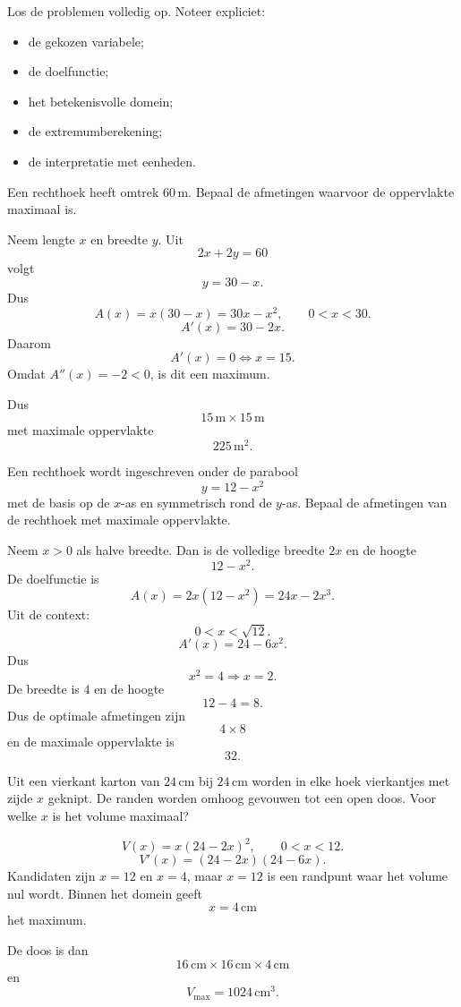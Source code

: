 \documentclass{ximera}
\begin{document}
\begin{oefening}{\oefU\ESS}
Los de problemen volledig op. Noteer expliciet:

\begin{itemize}
  \item de gekozen variabele;
  \item de doelfunctie;
  \item het betekenisvolle domein;
  \item de extremumberekening;
  \item de interpretatie met eenheden.
\end{itemize}

\begin{question}
Een rechthoek heeft omtrek \(60\,\mathrm m\). Bepaal de afmetingen
waarvoor de oppervlakte maximaal is.

\begin{oplossing}
Neem lengte \(x\) en breedte \(y\). Uit
\[
2x+2y=60
\]
volgt
\[
y=30-x.
\]
Dus
\[
A(x)=x(30-x)=30x-x^2,
\qquad 0<x<30.
\]
\[
A'(x)=30-2x.
\]
Daarom
\[
A'(x)=0\Longleftrightarrow x=15.
\]
Omdat \(A''(x)=-2<0\), is dit een maximum.

Dus
\[
\boxed{15\,\mathrm m\times15\,\mathrm m}
\]
met maximale oppervlakte
\[
\boxed{225\,\mathrm m^2}.
\]
\end{oplossing}
\end{question}

\begin{question}
Een rechthoek wordt ingeschreven onder de parabool
\[
y=12-x^2
\]
met de basis op de \(x\)-as en symmetrisch rond de \(y\)-as. Bepaal de
afmetingen van de rechthoek met maximale oppervlakte.

\begin{oplossing}
Neem \(x>0\) als halve breedte. Dan is de volledige breedte \(2x\) en
de hoogte
\[
12-x^2.
\]
De doelfunctie is
\[
A(x)=2x(12-x^2)=24x-2x^3.
\]
Uit de context:
\[
0<x<\sqrt{12}.
\]
\[
A'(x)=24-6x^2.
\]
Dus
\[
x^2=4\Longrightarrow x=2.
\]
De breedte is \(4\) en de hoogte
\[
12-4=8.
\]
Dus de optimale afmetingen zijn
\[
\boxed{4\times8}
\]
en de maximale oppervlakte is
\[
\boxed{32}.
\]
\end{oplossing}
\end{question}

\begin{question}
Uit een vierkant karton van \(24\,\mathrm{cm}\) bij
\(24\,\mathrm{cm}\) worden in elke hoek vierkantjes met zijde \(x\)
geknipt. De randen worden omhoog gevouwen tot een open doos. Voor welke
\(x\) is het volume maximaal?

\begin{oplossing}
\[
V(x)=x(24-2x)^2,
\qquad 0<x<12.
\]
\[
V'(x)=(24-2x)(24-6x).
\]
Kandidaten zijn \(x=12\) en \(x=4\), maar \(x=12\) is een randpunt waar
het volume nul wordt. Binnen het domein geeft
\[
\boxed{x=4\,\mathrm{cm}}
\]
het maximum.

De doos is dan
\[
16\,\mathrm{cm}\times16\,\mathrm{cm}\times4\,\mathrm{cm}
\]
en
\[
\boxed{V_{\max}=1024\,\mathrm{cm}^3}.
\]
\end{oplossing}
\end{question}
\end{oefening}
\end{document}
